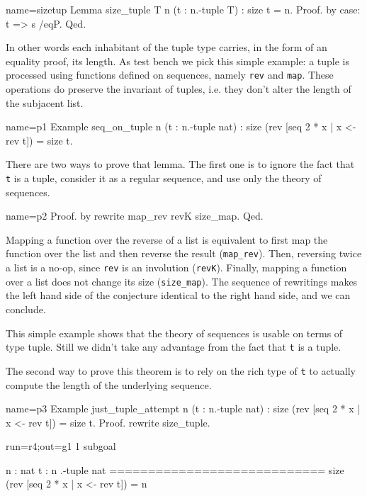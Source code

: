 \begin{coq}{name=sizetup}{}
Lemma size_tuple T n (t : n.-tuple T) : size t = n.
Proof. by case: t => s /eqP. Qed.
\end{coq}

In other words each inhabitant of the tuple type carries,
in the form of an equality proof, its length.  As test bench
we pick this simple example: a tuple is processed using
functions defined on sequences, namely \lstinline/rev/ and
\lstinline/map/.  These operations do preserve the invariant of
tuples, i.e. they don't alter the length of the subjacent list.

\begin{coq}{name=p1}{}
Example seq_on_tuple n (t : n.-tuple nat) :
  size (rev [seq 2 * x | x <- rev t]) = size t.
\end{coq}

There are two ways to prove that lemma.  The first one is
to ignore the fact that \lstinline/t/ is a tuple, consider it
as a regular sequence, and use only the theory of sequences.

\begin{coq}{name=p2}{}
Proof. by rewrite map_rev revK size_map. Qed.
\end{coq}

Mapping a function over the reverse of a list is equivalent to
first map the function over the list and then reverse the result
(\lstinline/map_rev/).  Then, reversing twice a list is a no-op, since
\lstinline/rev/ is an involution
(\lstinline/revK/).  Finally, mapping a function over a list does not
change its size (\lstinline/size_map/).  The sequence of rewritings
makes the left hand side of the conjecture identical to the right hand
side, and we can conclude.

This simple example shows that the theory of sequences is usable
on terms of type tuple.  Still we didn't take any advantage from
the fact that  \lstinline/t/ is a tuple.

The second way to prove this theorem is to rely on the rich type
of \lstinline/t/ to actually compute the length of the underlying
sequence.

\begin{coq}{name=p3}{}
Example just_tuple_attempt n (t : n.-tuple nat) :
  size (rev [seq 2 * x | x <- rev t]) = size t.
Proof. rewrite size_tuple.
\end{coq}
\begin{coqout}{run=r4;out=g1}{}
1 subgoal

 n : nat
 t : n .-tuple nat
 ============================
 size (rev [seq 2 * x | x <- rev t]) = n
\end{coqout}

